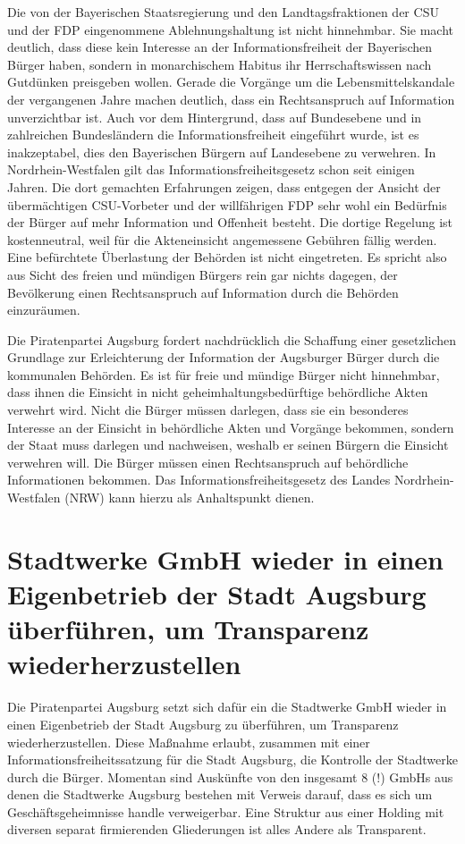   Die von der Bayerischen Staatsregierung und den Landtagsfraktionen der CSU 
  und der FDP eingenommene Ablehnungshaltung ist nicht hinnehmbar. Sie macht 
  deutlich, dass diese kein Interesse an der Informationsfreiheit der 
  Bayerischen Bürger haben, sondern in monarchischem Habitus ihr 
  Herrschaftswissen nach Gutdünken preisgeben wollen. Gerade die Vorgänge um 
  die Lebensmittelskandale der vergangenen Jahre machen deutlich, dass ein 
  Rechtsanspruch auf Information unverzichtbar ist. Auch vor dem Hintergrund, 
  dass auf Bundesebene und in zahlreichen Bundesländern die 
  Informationsfreiheit eingeführt wurde, ist es inakzeptabel, dies den 
  Bayerischen Bürgern auf Landesebene zu verwehren. In Nordrhein-Westfalen 
  gilt das Informationsfreiheitsgesetz schon seit einigen Jahren. Die dort 
  gemachten Erfahrungen zeigen, dass entgegen der Ansicht der übermächtigen 
  CSU-Vorbeter und der willfährigen FDP sehr wohl ein Bedürfnis der Bürger auf 
  mehr Information und Offenheit besteht. Die dortige Regelung ist 
  kostenneutral, weil für die Akteneinsicht angemessene Gebühren fällig 
  werden. Eine befürchtete Überlastung der Behörden ist nicht eingetreten. Es 
  spricht also aus Sicht des freien und mündigen Bürgers rein gar nichts 
  dagegen, der Bevölkerung einen Rechtsanspruch auf Information durch die 
  Behörden einzuräumen.
  
  Die Piratenpartei Augsburg fordert nachdrücklich die Schaffung einer 
  gesetzlichen Grundlage zur Erleichterung der Information der Augsburger 
  Bürger durch die kommunalen Behörden. Es ist für freie und mündige Bürger 
  nicht hinnehmbar, dass ihnen die Einsicht in nicht geheimhaltungsbedürftige 
  behördliche Akten verwehrt wird. Nicht die Bürger müssen darlegen, dass sie 
  ein besonderes Interesse an der Einsicht in behördliche Akten und Vorgänge 
  bekommen, sondern der Staat muss darlegen und nachweisen, weshalb er seinen 
  Bürgern die Einsicht verwehren will. Die Bürger müssen einen Rechtsanspruch 
  auf behördliche Informationen bekommen. Das Informationsfreiheitsgesetz des 
  Landes Nordrhein-Westfalen (NRW) kann hierzu als Anhaltspunkt dienen.
  
  \section{Stadtwerke GmbH wieder in einen Eigenbetrieb der Stadt Augsburg 
  überführen, um Transparenz wiederherzustellen}
  
  Die Piratenpartei Augsburg setzt sich dafür ein die Stadtwerke GmbH wieder 
  in einen Eigenbetrieb der Stadt Augsburg zu überführen, um Transparenz 
  wiederherzustellen. Diese Maßnahme erlaubt, zusammen mit einer 
  Informationsfreiheitssatzung für die Stadt Augsburg, die Kontrolle der 
  Stadtwerke durch die Bürger. Momentan sind Auskünfte von den insgesamt 8 (!) 
  GmbHs aus denen die Stadtwerke Augsburg bestehen mit Verweis darauf, dass es 
  sich um Geschäftsgeheimnisse handle verweigerbar. Eine Struktur aus einer 
  Holding mit diversen separat firmierenden Gliederungen ist alles Andere als 
  Transparent.
  
